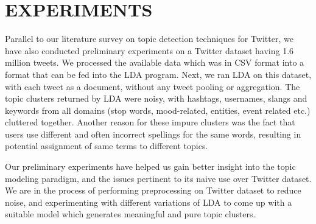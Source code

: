 \section{\uppercase{Experiments}}
Parallel to our literature survey on topic detection techniques for Twitter, we have also conducted preliminary experiments on a Twitter dataset having 1.6 million tweets. We processed the available data which was in CSV format into a format that can be fed into the LDA program. Next, we ran LDA on this dataset, with each tweet as a document, without any tweet pooling or aggregation. The topic clusters returned by LDA were noisy, with hashtags, usernames, slangs and keywords from all domains (stop words, mood-related, entities, event related etc.) cluttered together. Another reason for these impure clusters was the fact that users use different and often incorrect spellings for the same words, resulting in potential assignment of same terms to different topics.

Our preliminary experiments have helped us gain better insight into the topic modeling paradigm, and the issues pertinent to its naive use over Twitter dataset. We are in the process of performing preprocessing on Twitter dataset to reduce noise, and experimenting with different variations of LDA to come up with a suitable model which generates meaningful and pure topic clusters.
